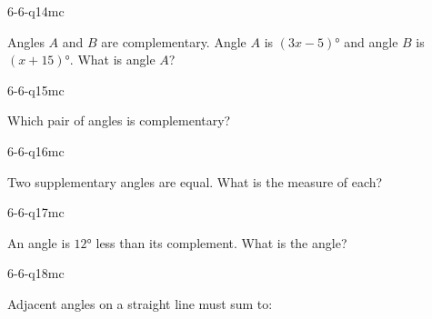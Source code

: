 \begin{practiceQuestion}{6-6-q14}{mc}
\begin{questionText}
Angles $A$ and $B$ are complementary. Angle $A$ is $(3x - 5)°$ and angle $B$ is $(x + 15)°$. What is angle $A$?
\end{questionText}
\end{practiceQuestion}

\begin{practiceQuestion}{6-6-q15}{mc}
\begin{questionText}
Which pair of angles is complementary?
\end{questionText}
\end{practiceQuestion}

\begin{practiceQuestion}{6-6-q16}{mc}
\begin{questionText}
Two supplementary angles are equal. What is the measure of each?
\end{questionText}
\end{practiceQuestion}

\begin{practiceQuestion}{6-6-q17}{mc}
\begin{questionText}
An angle is $12°$ less than its complement. What is the angle?
\end{questionText}
\end{practiceQuestion}

\begin{practiceQuestion}{6-6-q18}{mc}
\begin{questionText}
Adjacent angles on a straight line must sum to:
\end{questionText}
\end{practiceQuestion}

